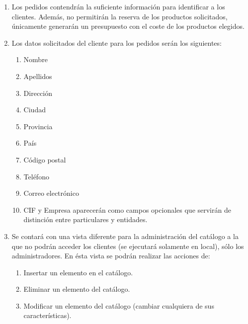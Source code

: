 \begin{enumerate}[label=\bf RF\twodigits*.,leftmargin=*]
\item Los pedidos contendrán la suficiente información para identificar a los clientes. Además, no permitirán la reserva de los productos solicitados, únicamente generarán un presupuesto con el coste de los productos elegidos.

\item Los datos solicitados del cliente para los pedidos serán los siguientes:
	\begin{enumerate}[label=\textbf{\arabic*} -]
		\item Nombre 
		\item Apellidos
	    \item Dirección
	    \item Ciudad
	    \item Provincia
	    \item País
	    \item Código postal
	    \item Teléfono
	    \item Correo electrónico
	    \item CIF y Empresa aparecerán como campos opcionales que servirán de distinción entre particulares y entidades.
	\end{enumerate}

\item Se contará con una vista diferente para la administración del catálogo a la que no podrán acceder los clientes (se ejecutará solamente en local), sólo los administradores.
En ésta vista se podrán realizar las acciones de:
	\begin{enumerate}[label=\textbf{\arabic*} -]
    	\item Insertar un elemento en el catálogo.
		\item Eliminar un elemento del catálogo.
        \item Modificar un elemento del catálogo (cambiar cualquiera de sus características).
    \end{enumerate}   
\end{enumerate}
